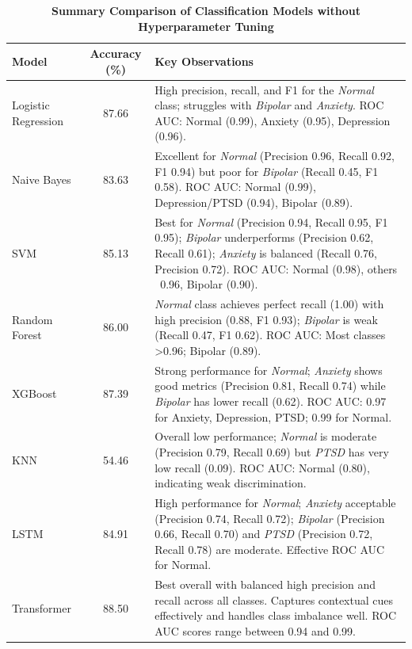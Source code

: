 \begin{table}[H]
    \centering
    \renewcommand{\arraystretch}{1.2}
    \small
    \begin{tabularx}{\textwidth}{|l|c|X|}
    \hline
    \textbf{Model} & \textbf{Accuracy (\%)} & \textbf{Key Observations} \\
    \hline
    Logistic Regression & 87.66 & High precision, recall, and F1 for the \textit{Normal} class; struggles with \textit{Bipolar} and \textit{Anxiety}. ROC AUC: Normal (0.99), Anxiety (0.95), Depression (0.96). \\
    \hline
    Naive Bayes & 83.63 & Excellent for \textit{Normal} (Precision 0.96, Recall 0.92, F1 0.94) but poor for \textit{Bipolar} (Recall 0.45, F1 0.58). \newline ROC AUC: Normal (0.99), Depression/PTSD (0.94), Bipolar (0.89). \\
    \hline
    SVM & 85.13 & Best for \textit{Normal} (Precision 0.94, Recall 0.95, F1 0.95); \textit{Bipolar} underperforms (Precision 0.62, Recall 0.61); \textit{Anxiety} is balanced (Recall 0.76, Precision 0.72). \newline ROC AUC: Normal (0.98), others ~0.96, Bipolar (0.90). \\
    \hline
    Random Forest & 86.00 & \textit{Normal} class achieves perfect recall (1.00) with high precision (0.88, F1 0.93); \textit{Bipolar} is weak (Recall 0.47, F1 0.62). \newline ROC AUC: Most classes >0.96; Bipolar (0.89). \\
    \hline
    XGBoost & 87.39 & Strong performance for \textit{Normal}; \textit{Anxiety} shows good metrics (Precision 0.81, Recall 0.74) while \textit{Bipolar} has lower recall (0.62). \newline ROC AUC: 0.97 for Anxiety, Depression, PTSD; 0.99 for Normal. \\
    \hline
    KNN & 54.46 & Overall low performance; \textit{Normal} is moderate (Precision 0.79, Recall 0.69) but \textit{PTSD} has very low recall (0.09). \newline ROC AUC: Normal (0.80), indicating weak discrimination. \\
    \hline
    LSTM & 84.91 & High performance for \textit{Normal}; \textit{Anxiety} acceptable (Precision 0.74, Recall 0.72); \textit{Bipolar} (Precision 0.66, Recall 0.70) and \textit{PTSD} (Precision 0.72, Recall 0.78) are moderate. \newline Effective ROC AUC for Normal. \\
    \hline
    Transformer & 88.50 & Best overall with balanced high precision and recall across all classes. Captures contextual cues effectively and handles class imbalance well. \newline ROC AUC scores range between 0.94 and 0.99. \\
    \hline
    \end{tabularx}
    \caption*{\textbf{Summary Comparison of  Classification Models without Hyperparameter Tuning}}
    \label{tab:model_comparison}
\end{table}


